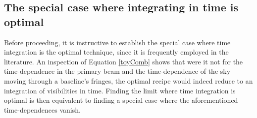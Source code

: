 \documentclass[twocolumn,apj,numberedappendix]{emulateapj}
\begin{document}
\subsection{The special case where integrating in time is optimal}

Before proceeding, it is instructive to establish the special case where time
integration is the optimal technique, since it is frequently employed in the
literature.  An inspection of Equation \eqref{toyComb} shows that were it not
for the time-dependence in the primary beam and the time-dependence of the sky
moving through a baseline's fringes, the optimal recipe would indeed reduce to
an integration of visibilities in time.  Finding the limit where time
integration is optimal is then equivalent to finding a special case where the
aforementioned time-dependences vanish.
\end{document}
